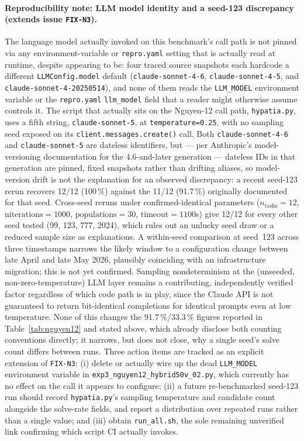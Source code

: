 \documentclass[twoside,11pt]{article}
\begin{document}
\paragraph{Reproducibility note: LLM model identity and a seed-123
discrepancy (extends issue \texttt{FIX-N3}).} The language model actually
invoked on this benchmark's call path is not pinned via any
environment-variable or \texttt{repro.yaml} setting that is actually read
at runtime, despite appearing to be: four traced source snapshots each
hardcode a different \texttt{LLMConfig.model} default
(\texttt{claude-sonnet-4-6}, \texttt{claude-sonnet-4-5}, and
\texttt{claude-sonnet-4-20250514}), and none of them reads the
\texttt{LLM\_MODEL} environment variable or the \texttt{repro.yaml}
\texttt{llm\_model} field that a reader might otherwise assume controls
it. The script that actually sits on the Nguyen-12 call path,
\texttt{hypatia.py}, uses a fifth string, \texttt{claude-sonnet-5}, at
\texttt{temperature=0.25}, with no sampling seed exposed on its
\texttt{client.messages.create()} call. Both \texttt{claude-sonnet-4-6}
and \texttt{claude-sonnet-5} are dateless identifiers, but --- per
Anthropic's model-versioning documentation for the 4.6-and-later
generation --- dateless IDs in that generation are pinned, fixed
snapshots rather than drifting aliases, so model-version drift is not the
explanation for an observed discrepancy: a recent seed-123 rerun recovers
12/12 (100\,\%) against the 11/12 (91.7\,\%) originally documented for
that seed. Cross-seed reruns under confirmed-identical parameters
($n_{\text{tasks}}=12$, $\text{niterations}=1000$, $\text{populations}=30$,
$\text{timeout}=1100$s) give 12/12 for every other seed tested (99, 123,
777, 2024), which rules out an unlucky seed draw or a reduced sample size
as explanations. A within-seed comparison at seed~123 across three
timestamps narrows the likely window to a configuration change between
late April and late May 2026, plausibly coinciding with an infrastructure
migration; this is not yet confirmed. Sampling nondeterminism at the
(unseeded, non-zero-temperature) LLM layer remains a contributing,
independently verified factor regardless of which code path is in play,
since the Claude API is not guaranteed to return bit-identical completions
for identical prompts even at low temperature. None of this changes the
91.7\,\%/33.3\,\% figures reported in Table~\ref{tab:nguyen12} and stated
above, which already disclose both counting conventions directly; it
narrows, but does not close, why a single seed's solve count differs
between runs. Three action items are tracked as an explicit extension of
\texttt{FIX-N3}: (i) delete or actually wire up the dead
\texttt{LLM\_MODEL} environment variable in
\texttt{exp3\_nguyen12\_hybrid50v\_02.py}, which currently has no effect
on the call it appears to configure; (ii) a future re-benchmarked
seed-123 run should record \texttt{hypatia.py}'s sampling temperature and
candidate count alongside the solve-rate fields, and report a
distribution over repeated runs rather than a single value; and
(iii) obtain \texttt{run\_all.sh}, the sole remaining unverified link
confirming which script CI actually invokes.
\end{document}
